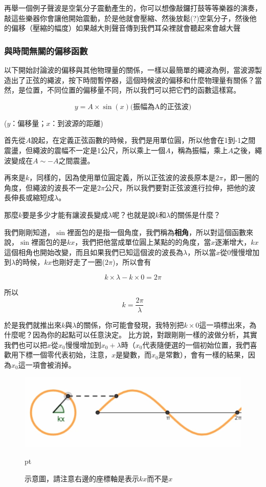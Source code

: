 再舉一個例子聲波是空氣分子震動產生的，你可以想像敲鑼打鼓等等樂器的演奏，敲這些樂器你會讓他開始震動，於是他就會壓縮、然後放鬆(?)空氣分子，然後他的偏移（壓縮的幅度）如果越大則聲音傳到我們耳朵裡就會聽起來會越大聲

\subsubsection{與時間無關的偏移函數}
以下開始討論波的偏移與其他物理量的關係，一樣以最簡單的繩波為例，當波源製造出了正弦的繩波，按下時間暫停器，這個時候波的偏移和什麼物理量有關係？當然，是位置，不同位置的偏移量不同，所以我們可以把它們的函數這樣寫。

$$y=A \times \sin (x) \mbox{(振幅為A的正弦波)}$$
\begin{center}
($y$：偏移量；$x$：到波源的距離)
\end{center}


首先從$A$說起，在定義正弦函數的時候，我們是用單位圓，所以他會在1到-1之間震盪，但繩波的震幅不一定是1公尺，所以乘上一個$A$，稱為振幅，乘上$A$之後，繩波變成在$A\sim -A$之間震盪。


再來是$k$，同樣的，因為使用單位圓定義，所以正弦波的波長原本是$2\pi$，即一圈的角度，但繩波的波長不一定是$2\pi$公尺，所以我們要對正弦波進行拉伸，把他的波長伸長或縮短成$\lambda$。

那麼$k$要是多少才能有讓波長變成$\lambda$呢？也就是說$k$和$\lambda$的關係是什麼？

我們剛剛知道，$\sin$裡面包的是指一個角度，我們稱為\textbf{相角}，所以對這個函數來說，$\sin$裡面包的是$kx$，我們把他當成單位圓上某點的的角度，當$x$逐漸增大，$kx$這個相角也開始改變，而且如果我們已知這個波的波長為$\lambda$，所以當$x$從0慢慢增加到$\lambda$的時候，$kx$也剛好走了一圈($2\pi$)，所以會有

$$
k \times \lambda-k \times 0=2 \pi
$$

所以
$$ k = \frac{2\pi}{\lambda} $$

於是我們就推出來$k$與$\lambda$的關係，你可能會發現，我特別把$k\times0$這一項標出來，為什麼呢？因為你的起點可以任意決定。
比方說，對跟剛剛一樣的波做分析，其實我們也可以把$x$從$x_0$慢慢增加到$x_0+\lambda$時（$x_0$代表隨便選的一個初始位置，我們喜歡用下標一個零代表初始，注意，$x$是變數，而$x_0$是常數），會有一樣的結果，因為$x_0$這一項會被消掉。
\begin{figure}[H]
\centering
\graphicspath{{physics/}}
\includegraphics[width=\textwidth, center]{circle-wave.png}
\caption{示意圖，請注意右邊的座標軸是表示$kx$而不是$x$}  pt
\label{fig:circle-wave}
\end{figure}

